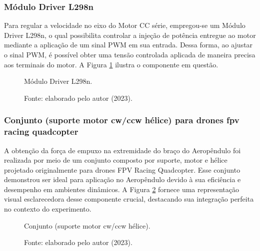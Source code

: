 \subsubsection{Módulo Driver L298n}
\label{driver_l298n}

Para regular a velocidade no eixo do Motor CC série, empregou-se um Módulo Driver L298n, o qual possibilita controlar a injeção de potência entregue ao motor mediante a aplicação de um sinal PWM em sua entrada. Dessa forma, ao ajustar o sinal PWM, é possível obter uma tensão controlada aplicada de maneira precisa aos terminais do motor. A Figura \ref{fig3:image_07} ilustra o componente em questão.

\begin{figure}[!h]
	\centering
	\caption{Módulo Driver L298n.}
	\caption*{Fonte: elaborado pelo autor (2023).}
	\label{fig3:image_07}
\end{figure}


\subsubsection{Conjunto (suporte motor cw/ccw hélice) para drones fpv racing quadcopter}


A obtenção da força de empuxo na extremidade do braço do Aeropêndulo foi realizada por meio de um conjunto composto por suporte, motor e hélice projetado originalmente para drones FPV Racing Quadcopter. Esse conjunto demonstrou ser ideal para aplicação no Aeropêndulo devido à sua eficiência e desempenho em ambientes dinâmicos. A Figura \ref{fig3:image_08} fornece uma representação visual esclarecedora desse componente crucial, destacando sua integração perfeita no contexto do experimento.


\begin{figure}[!h]
	\centering
	\caption{Conjunto (suporte motor cw/ccw hélice).}
	\caption*{Fonte: elaborado pelo autor (2023).}
	\label{fig3:image_08}
\end{figure}

